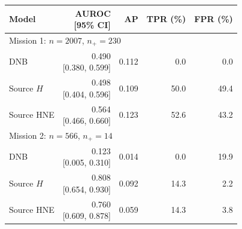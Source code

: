 \begin{tabular*}{\linewidth}{@{\extracolsep{\fill}}lrrrr@{}}
\toprule
Model & \shortstack{AUROC\\{}[95\% CI]} & AP & TPR (\%) & FPR (\%) \\
\midrule
\multicolumn{5}{l}{Mission 1: $n=2007$, $n_+=230$} \\
\midrule
DNB & \shortstack[r]{0.490 \\ {}[0.380, 0.599]} & 0.112 & 0.0 & 0.0 \\
Source $H$ & \shortstack[r]{0.498 \\ {}[0.404, 0.596]} & 0.109 & 50.0 & 49.4 \\
Source HNE & \shortstack[r]{0.564 \\ {}[0.466, 0.660]} & 0.123 & 52.6 & 43.2 \\
\midrule
\multicolumn{5}{l}{Mission 2: $n=566$, $n_+=14$} \\
\midrule
DNB & \shortstack[r]{0.123 \\ {}[0.005, 0.310]} & 0.014 & 0.0 & 19.9 \\
Source $H$ & \shortstack[r]{0.808 \\ {}[0.654, 0.930]} & 0.092 & 14.3 & 2.2 \\
Source HNE & \shortstack[r]{0.760 \\ {}[0.609, 0.878]} & 0.059 & 14.3 & 3.8 \\
\bottomrule
\end{tabular*}